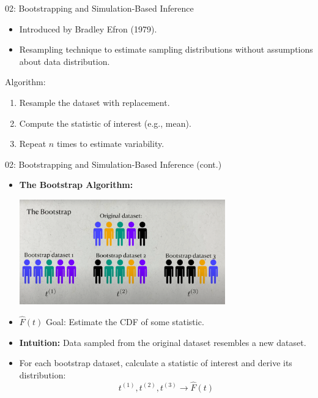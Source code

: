 \documentclass{beamer}
\begin{document}
\begin{frame}{02: Bootstrapping and Simulation-Based Inference}
\begin{itemize}
    \item Introduced by Bradley Efron (1979).
    \item Resampling technique to estimate sampling distributions without assumptions about data distribution.
\end{itemize}

\begin{exampleblock}{Algorithm:}
\begin{enumerate}
    \item Resample the dataset with replacement.
    \item Compute the statistic of interest (e.g., mean).
    \item Repeat \( n \) times to estimate variability.
\end{enumerate}
\end{exampleblock}
\end{frame}

\begin{frame}{02: Bootstrapping and Simulation-Based Inference (cont.)}
\begin{itemize}
    \item \textbf{The Bootstrap Algorithm:}
    \begin{center}
        \includegraphics[width=0.7\textwidth]{bootstrap_populations.png}
    \end{center}
    \item \( \hat{F}(t) \) Goal: Estimate the CDF of some statistic.
    \item \textbf{Intuition:} Data sampled from the original dataset resembles a new dataset.
    \item For each bootstrap dataset, calculate a statistic of interest and derive its distribution:
    \[
    t^{(1)}, t^{(2)}, t^{(3)} \to \hat{F}(t)
    \]
\end{itemize}
\end{frame}
\end{document}
